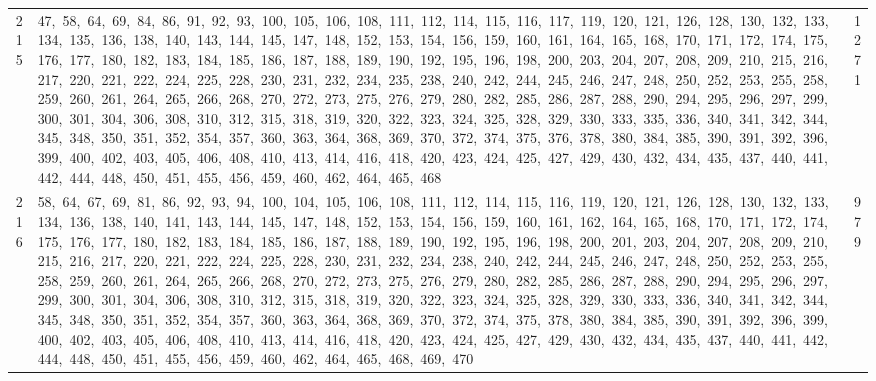 \begin{longtable}{c|p{}|r}
215 & 47,\ 58,\ 64,\ 69,\ 84,\ 86,\ 91,\ 92,\ 93,\ 100,\ 105,\ 106,\ 108,\ 111,\ 112,\ 114,\ 115,\ 116,\ 117,\ 119,\ 120,\ 121,\ 126,\ 128,\ 130,\ 132,\ 133,\ 134,\ 135,\ 136,\ 138,\ 140,\ 143,\ 144,\ 145,\ 147,\ 148,\ 152,\ 153,\ 154,\ 156,\ 159,\ 160,\ 161,\ 164,\ 165,\ 168,\ 170,\ 171,\ 172,\ 174,\ 175,\ 176,\ 177,\ 180,\ 182,\ 183,\ 184,\ 185,\ 186,\ 187,\ 188,\ 189,\ 190,\ 192,\ 195,\ 196,\ 198,\ 200,\ 203,\ 204,\ 207,\ 208,\ 209,\ 210,\ 215,\ 216,\ 217,\ 220,\ 221,\ 222,\ 224,\ 225,\ 228,\ 230,\ 231,\ 232,\ 234,\ 235,\ 238,\ 240,\ 242,\ 244,\ 245,\ 246,\ 247,\ 248,\ 250,\ 252,\ 253,\ 255,\ 258,\ 259,\ 260,\ 261,\ 264,\ 265,\ 266,\ 268,\ 270,\ 272,\ 273,\ 275,\ 276,\ 279,\ 280,\ 282,\ 285,\ 286,\ 287,\ 288,\ 290,\ 294,\ 295,\ 296,\ 297,\ 299,\ 300,\ 301,\ 304,\ 306,\ 308,\ 310,\ 312,\ 315,\ 318,\ 319,\ 320,\ 322,\ 323,\ 324,\ 325,\ 328,\ 329,\ 330,\ 333,\ 335,\ 336,\ 340,\ 341,\ 342,\ 344,\ 345,\ 348,\ 350,\ 351,\ 352,\ 354,\ 357,\ 360,\ 363,\ 364,\ 368,\ 369,\ 370,\ 372,\ 374,\ 375,\ 376,\ 378,\ 380,\ 384,\ 385,\ 390,\ 391,\ 392,\ 396,\ 399,\ 400,\ 402,\ 403,\ 405,\ 406,\ 408,\ 410,\ 413,\ 414,\ 416,\ 418,\ 420,\ 423,\ 424,\ 425,\ 427,\ 429,\ 430,\ 432,\ 434,\ 435,\ 437,\ 440,\ 441,\ 442,\ 444,\ 448,\ 450,\ 451,\ 455,\ 456,\ 459,\ 460,\ 462,\ 464,\ 465,\ 468 & 1271 \\
216 & 58,\ 64,\ 67,\ 69,\ 81,\ 86,\ 92,\ 93,\ 94,\ 100,\ 104,\ 105,\ 106,\ 108,\ 111,\ 112,\ 114,\ 115,\ 116,\ 119,\ 120,\ 121,\ 126,\ 128,\ 130,\ 132,\ 133,\ 134,\ 136,\ 138,\ 140,\ 141,\ 143,\ 144,\ 145,\ 147,\ 148,\ 152,\ 153,\ 154,\ 156,\ 159,\ 160,\ 161,\ 162,\ 164,\ 165,\ 168,\ 170,\ 171,\ 172,\ 174,\ 175,\ 176,\ 177,\ 180,\ 182,\ 183,\ 184,\ 185,\ 186,\ 187,\ 188,\ 189,\ 190,\ 192,\ 195,\ 196,\ 198,\ 200,\ 201,\ 203,\ 204,\ 207,\ 208,\ 209,\ 210,\ 215,\ 216,\ 217,\ 220,\ 221,\ 222,\ 224,\ 225,\ 228,\ 230,\ 231,\ 232,\ 234,\ 238,\ 240,\ 242,\ 244,\ 245,\ 246,\ 247,\ 248,\ 250,\ 252,\ 253,\ 255,\ 258,\ 259,\ 260,\ 261,\ 264,\ 265,\ 266,\ 268,\ 270,\ 272,\ 273,\ 275,\ 276,\ 279,\ 280,\ 282,\ 285,\ 286,\ 287,\ 288,\ 290,\ 294,\ 295,\ 296,\ 297,\ 299,\ 300,\ 301,\ 304,\ 306,\ 308,\ 310,\ 312,\ 315,\ 318,\ 319,\ 320,\ 322,\ 323,\ 324,\ 325,\ 328,\ 329,\ 330,\ 333,\ 336,\ 340,\ 341,\ 342,\ 344,\ 345,\ 348,\ 350,\ 351,\ 352,\ 354,\ 357,\ 360,\ 363,\ 364,\ 368,\ 369,\ 370,\ 372,\ 374,\ 375,\ 378,\ 380,\ 384,\ 385,\ 390,\ 391,\ 392,\ 396,\ 399,\ 400,\ 402,\ 403,\ 405,\ 406,\ 408,\ 410,\ 413,\ 414,\ 416,\ 418,\ 420,\ 423,\ 424,\ 425,\ 427,\ 429,\ 430,\ 432,\ 434,\ 435,\ 437,\ 440,\ 441,\ 442,\ 444,\ 448,\ 450,\ 451,\ 455,\ 456,\ 459,\ 460,\ 462,\ 464,\ 465,\ 468,\ 469,\ 470 & 979 \\

\end{longtable}
